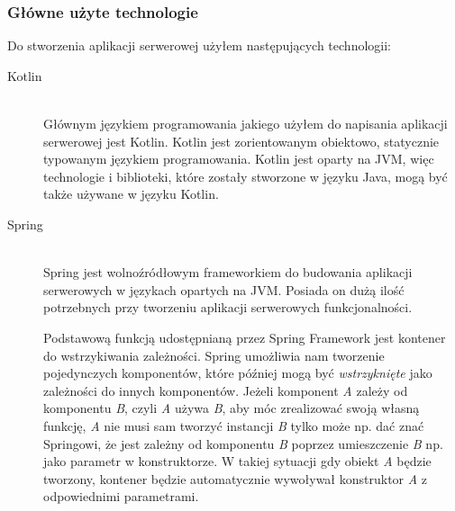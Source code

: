 \subsubsection{Główne użyte technologie}
Do stworzenia aplikacji serwerowej użyłem następujących technologii:

\begin{description}
  \item[Kotlin] \hfill \\ Głównym językiem programowania jakiego użyłem do napisania aplikacji serwerowej jest Kotlin. Kotlin jest zorientowanym obiektowo, statycznie typowanym językiem programowania. Kotlin jest oparty na JVM, więc technologie i biblioteki, które zostały stworzone w języku Java, mogą być także używane w języku Kotlin. 
  \item[Spring] \hfill \\ Spring jest wolnoźródłowym frameworkiem do budowania aplikacji serwerowych w językach opartych na JVM. Posiada on dużą ilość potrzebnych przy tworzeniu aplikacji serwerowych funkcjonalności. 

    Podstawową funkcją udostępnianą przez Spring Framework jest kontener do wstrzykiwania zależności. Spring umożliwia nam tworzenie pojedynczych komponentów, które później mogą być \emph{wstrzyknięte} jako zależności do innych komponentów. Jeżeli komponent \emph{A} zależy od komponentu \emph{B}, czyli \emph{A} używa \emph{B}, aby móc zrealizować swoją własną funkcję, \emph{A} nie musi sam tworzyć instancji \emph{B} tylko może np. dać znać Springowi, że jest zależny od komponentu \emph{B} poprzez umieszczenie \emph{B} np. jako parametr w konstruktorze. W takiej sytuacji gdy obiekt \emph{A} będzie tworzony, kontener będzie automatycznie wywoływał konstruktor \emph{A} z odpowiednimi parametrami.


\end{description}
